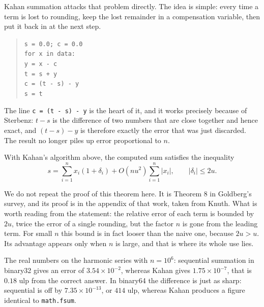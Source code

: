 Kahan summation attacks that problem directly.
The idea is simple: every time
a term is lost to rounding, keep the lost remainder in a compensation variable,
then put it back in at the next step.

\begin{quote}
\texttt{s = 0.0; c = 0.0}\\
\texttt{for x in data:}\\
\hspace*{1.5em}\texttt{y = x - c}\\
\hspace*{1.5em}\texttt{t = s + y}\\
\hspace*{1.5em}\texttt{c = (t - s) - y}\\
\hspace*{1.5em}\texttt{s = t}
\end{quote}

The line \texttt{c = (t - s) - y} is the heart of it, and it works precisely because of
Sterbenz: $t-s$ is the difference of two numbers that are close together and hence exact,
and $(t-s)-y$ is therefore exactly the error that was just discarded. The result no
longer piles up error proportional to $n$.

\begin{teorema}
With Kahan's algorithm above, the computed sum satisfies the inequality
\[
  s=\sum_{i=1}^{n}x_{i}(1+\delta_{i})+O(nu^{2})\sum_{i=1}^{n}|x_{i}|,
  \qquad |\delta_{i}|\le2u .
\]
\end{teorema}

We do not repeat the proof of this theorem here. It is Theorem 8 in Goldberg's
survey, and its proof is in the appendix of that work, taken from Knuth. What is worth
reading from the statement: the relative error of each term is bounded by $2u$, twice the
error of a single rounding, but the factor $n$ is gone from the leading term. For small
$n$ this bound is in fact looser than the naive one, because $2u>u$. Its advantage
appears only when $n$ is large, and that is where its whole use lies.

The real numbers on the harmonic series with $n=10^{6}$: sequential summation in
binary32 gives an error of $3.54\times10^{-2}$, whereas Kahan gives
$1.75\times10^{-7}$, that is $0.18$ ulp from the correct answer. In binary64
the difference is just as sharp: sequential is off by $7.35\times10^{-13}$, or $414$ ulp,
whereas Kahan produces a figure identical to \texttt{math.fsum}.

